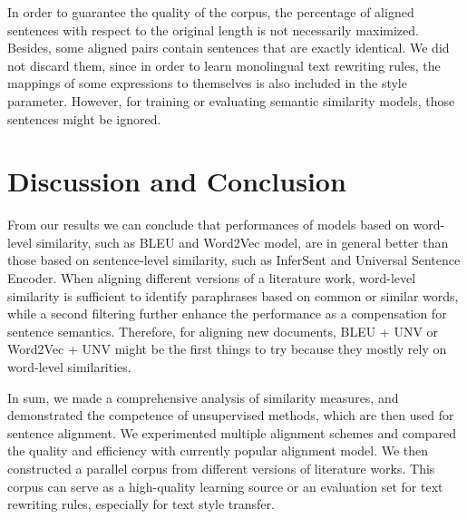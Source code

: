 \documentclass[runningheads]{llncs}
\begin{document}
\begin{spacing}{1.1}
In order to guarantee the quality of the corpus, the percentage of aligned sentences with respect to the original length is not necessarily maximized. Besides, some aligned pairs contain sentences that are exactly identical. We did not discard them, since in order to learn monolingual text rewriting rules, the mappings of some expressions to themselves is also included in the style parameter. However, for training or evaluating semantic similarity models, those sentences might be ignored.


\section{Discussion and Conclusion}

From our results we can conclude that performances of models based on word-level similarity, such as BLEU and Word2Vec model, are in general better than those based on sentence-level similarity, such as InferSent and Universal Sentence Encoder. When aligning different versions of a literature work, word-level similarity is sufficient to identify paraphrases based on common or similar words, while a second filtering further enhance the performance as a compensation for sentence semantics. Therefore, for aligning new documents, BLEU + UNV or Word2Vec + UNV might be the first things to try because they mostly rely on word-level similarities.

In sum, we made a comprehensive analysis of similarity measures, and demonstrated the competence of unsupervised methods, which are then used for sentence alignment. We experimented multiple alignment schemes and compared the quality and efficiency with currently popular alignment model. We then constructed a parallel corpus from different versions of literature works. This corpus can serve as a high-quality learning source or an evaluation set for text rewriting rules, especially for text style transfer.







%
%
%
% 
%

\end{spacing}
\end{document}
